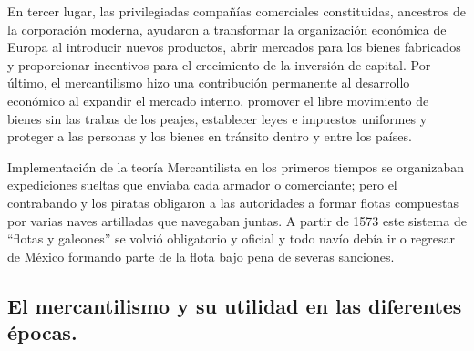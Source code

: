 \documentclass[
  stu,
  floatsintext,
  longtable,
  a4paper,
  nolmodern,
  notxfonts,
  notimes,
  12pt,
  colorlinks=true,linkcolor=blue,citecolor=blue,urlcolor=blue]{apa7}
\begin{document}
En tercer lugar, las privilegiadas compañías comerciales constituidas,
ancestros de la corporación moderna, ayudaron a transformar la
organización económica de Europa al introducir nuevos productos, abrir
mercados para los bienes fabricados y proporcionar incentivos para el
crecimiento de la inversión de capital. Por último, el mercantilismo
hizo una contribución permanente al desarrollo económico al expandir el
mercado interno, promover el libre movimiento de bienes sin las trabas
de los peajes, establecer leyes e impuestos uniformes y proteger a las
personas y los bienes en tránsito dentro y entre los países.

Implementación de la teoría Mercantilista en los primeros tiempos se
organizaban expediciones sueltas que enviaba cada armador o comerciante;
pero el contrabando y los piratas obligaron a las autoridades a formar
flotas compuestas por varias naves artilladas que navegaban juntas. A
partir de 1573 este sistema de ``flotas y galeones'' se volvió
obligatorio y oficial y todo navío debía ir o regresar de México
formando parte de la flota bajo pena de severas sanciones.

\subsection{El mercantilismo y su utilidad en las diferentes
épocas.}\label{el-mercantilismo-y-su-utilidad-en-las-diferentes-uxe9pocas.}
\end{document}
